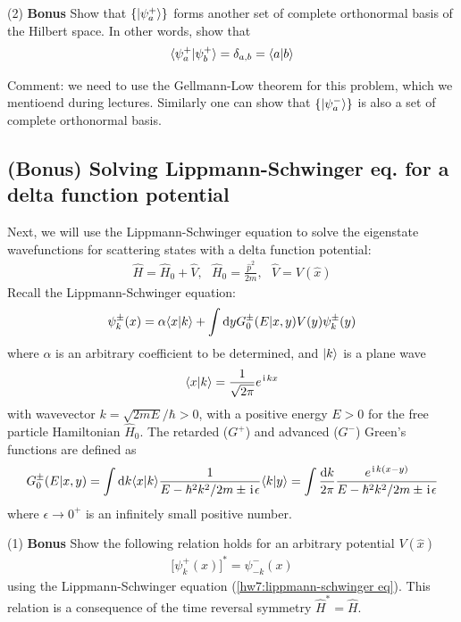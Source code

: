 (2) \textbf{Bonus} Show that $\{|{\psi^+_a}\rangle\}$ forms another set of complete orthonormal basis of the Hilbert space. In other words, show that
\begin{align}
\langle{\psi^+_a|\psi^+_b}\rangle=\delta_{a,b}=\langle{a|b}\rangle
\end{align}

Comment: we need to use the Gellmann-Low theorem for this problem, which we mentioend during lectures. Similarly one can show that $\{|{\psi^-_a}\rangle\}$ is also a set of complete orthonormal basis. 

\subsection{(Bonus) Solving Lippmann-Schwinger eq. for a delta function potential}

Next, we will use the Lippmann-Schwinger equation to solve the eigenstate wavefunctions for scattering states with a delta function potential:
\begin{align}
\hat H=\hat H_0+\hat V,~~~\hat H_0=\frac{\hat p^2}{2m},~~~\hat V=V(\hat x)
\end{align}
Recall the Lippmann-Schwinger equation:
\begin{align}\label{hw7:lippmann-schwinger eq}
\psi^{\pm}_k(x)=\alpha\langle{x|k}\rangle+\int\text{d}yG_0^{\pm}(E|x,y)V(y)\psi^{\pm}_k(y)
\end{align}
where $\alpha$ is an arbitrary coefficient to be determined, and $|{k}\rangle$ is a plane wave 
\begin{align}
\langle{x|k}\rangle=\frac1{\sqrt{2\pi}}e^{\hspace{1pt}\mathrm{i}\hspace{1pt} kx}
\end{align}
with wavevector $k=\sqrt{2mE}/\hbar>0$, with a positive energy $E>0$ for the free particle Hamiltonian $\hat H_0$. The retarded ($G^+$) and advanced ($G^-$) Green's functions are defined as 
\begin{align}\label{hw7:Green's function}
G_0^{\pm}(E|x,y)=\int\text{d}k\langle{x|k}\rangle\frac{1}{E-\hbar^2k^2/2m\pm\hspace{1pt}\mathrm{i}\hspace{1pt}\epsilon}\langle{k|y}\rangle=\int\frac{\text{d}k}{2\pi}\frac{e^{\hspace{1pt}\mathrm{i}\hspace{1pt} k(x-y)}}{E-\hbar^2k^2/2m\pm\hspace{1pt}\mathrm{i}\hspace{1pt}\epsilon}
\end{align}
where $\epsilon\rightarrow0^+$ is an infinitely small positive number. 

(1) \textbf{Bonus} Show the following relation holds for an arbitrary potential $V(\hat x)$
\begin{align}
\big[\psi^+_k(x)\big]^\ast=\psi^-_{-k}(x)
\end{align}
using the Lippmann-Schwinger equation (\ref{hw7:lippmann-schwinger eq}). This relation is a consequence of the time reversal symmetry $\hat H^\ast=\hat H$.

